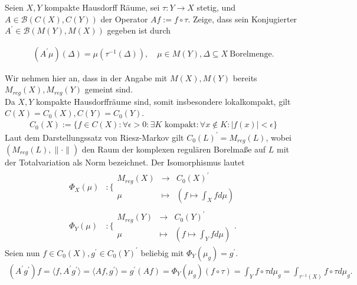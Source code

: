 \begin{exercise}[18/2]

Seien $X, Y$ kompakte Hausdorff Räume, sei $\tau: Y \to X$ stetig, und $A \in \mathcal{B}(C(X), C(Y))$ der Operator $A f := f \circ \tau$.
Zeige, dass sein Konjugierter $A^\prime \in \mathcal{B}(M(Y), M(X))$ gegeben ist durch

\begin{align*}
  (A^\prime \mu)(\Delta) = \mu(\tau^{-1}(\Delta)),
  \quad
  \mu \in M(Y), \Delta \subseteq X ~\text{Borelmenge}.
\end{align*}

\end{exercise}

\begin{solution}
Wir nehmen hier an, dass in der Angabe mit $M(X),M(Y)$ bereits $M_{reg}(X), M_{reg}(Y)$ gemeint sind. \\
Da $X,Y$ kompakte Hausdorffräume sind, somit insbesondere lokalkompakt, gilt $C(X) = C_0(X), C(Y) = C_0(Y)$.
\begin{align*}
  C_0(X) := \{f \in C(X): \forall \epsilon > 0: \exists K \text{ kompakt}:
  \forall x \notin K: |f(x)| < \epsilon\}
\end{align*}
Laut dem Darstellungssatz von Riesz-Markov gilt $C_0(L)^{\prime} = M_{reg}(L)$,
wobei $(M_{reg}(L), \|\cdot\|)$ den Raum der komplexen regulären Borelmaße auf $L$
mit der Totalvariation als Norm bezeichnet.
Der Isomorphismus lautet
\begin{align*}
  \Phi_X(\mu)&: \Bigg\{ \begin{matrix}
    M_{reg}(X) & \to & C_0(X)^{\prime} \\
    \mu & \mapsto & (f \mapsto \int_X f d\mu)
  \end{matrix} \\
  \Phi_Y(\mu)&: \Bigg\{ \begin{matrix}
    M_{reg}(Y) & \to & C_0(Y)^{\prime} \\
    \mu & \mapsto & (f \mapsto \int_Y f d\mu)
  \end{matrix}.
\end{align*}
Seien nun $f \in C_0(X), g^{\prime} \in C_0(Y)^{\prime}$ beliebig mit $\Phi_Y(\mu_g) = g^{\prime}$.
\begin{align*}
  (A^{\prime}g^{\prime})f = \langle f, A^{\prime}g^{\prime} \rangle = \langle A f, g^{\prime} \rangle
  = g^{\prime}(Af) = \Phi_Y(\mu_g)(f \circ \tau)
  = \int_Y f\circ \tau d\mu_g
  = \int_{\tau^{-1}(X)} f \circ \tau d\mu_g.
\end{align*}

\end{solution}
